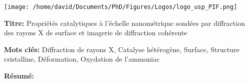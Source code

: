 \thispagestyle{empty}

\lhead{}
\rhead{}
\rfoot{}
\cfoot{}
\lfoot{}

\noindent 
\texttt{[image: /home/david/Documents/PhD/Figures/Logos/logo\_usp\_PIF.png]}
\vspace{0.5cm}

\small

\begin{mdframed}[linecolor=Prune,linewidth=1]

\textbf{Titre:} Propriétés catalytiques à l’échelle nanométrique sondées par diffraction des rayons X de surface et imagerie de diffraction cohérente

\noindent \textbf{Mots clés:} Diffraction de rayons X, Catalyse hétérogène, Surface, Structure cristalline, Déformation, Oxydation de l'ammoniac

\vspace{-.5cm}
\begin{multicols}{2}
\noindent \textbf{Résumé:}


\end{multicols}
\end{mdframed}
